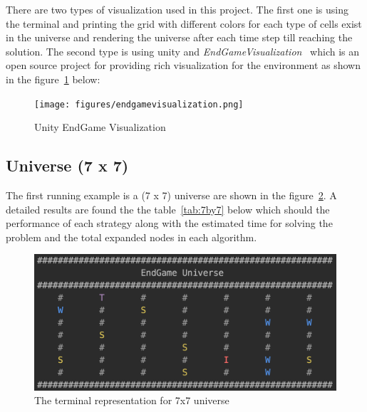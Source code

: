 \documentclass{article}
\begin{document}
There are two types of visualization used in this project. The first one is using the terminal and printing the grid with different colors for each type of cells exist in the universe and rendering the universe after each time step till reaching the solution. The second type is using unity and \textit{EndGameVisualization}~\cite{EndGameVisualizer} which is an open source project for providing rich visualization for the environment as shown in the figure~\ref{fig:endgamevisualization} below:

\begin{figure}[!hpt]
  \centering
  \texttt{[image: figures/endgamevisualization.png]}
  \caption{Unity EndGame Visualization}
  \label{fig:endgamevisualization}
\end{figure}

\clearpage

\subsection{Universe (7 x 7)}
The first running example is a (7 x 7) universe are shown in the figure~\ref{fig:7by7}. A detailed results are found the the table~\ref{tab:7by7} below which should the performance of each strategy along with the estimated time for solving the problem and the total expanded nodes in each algorithm.

\begin{figure}[!hpt]
  \centering
  \includegraphics[width=\linewidth]{figures/7by7.png}
  \caption{The terminal representation for 7x7 universe}
  \label{fig:7by7}
\end{figure}
\end{document}
